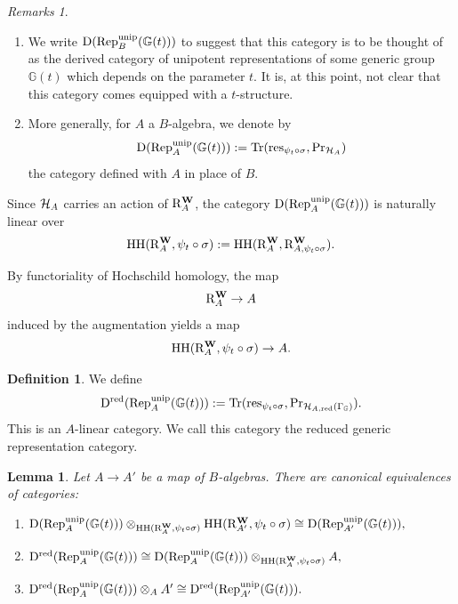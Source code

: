 \documentclass[a4paper, 10pt, oneside, reqno]{amsart}
\theoremstyle{plain}
\newtheorem{lem}[thm]{Lemma}
\theoremstyle{definition}
\newtheorem{defi}[thm]{Definition}
\theoremstyle{remark}
\newtheorem{rques}[thm]{Remarks}
\newcommand{\Gbb}{\mathbb{G}}
\newcommand{\RR}{\mathrm{R}}
\newcommand{\HHH}{\mathrm{HH}}
\newcommand{\Prr}{\mathrm{Pr}}
\newcommand{\restr}{\mathrm{res}}
\begin{document}
\begin{rques}
\begin{enumerate}
\item We write $\DD(\Rep_{B}^{\unip}(\Gbb(t)))$ to suggest that this category is to be thought of as the derived category of unipotent representations of some generic group $\Gbb(t)$ which depends on the parameter $t$. It is, at this point, not clear that this category comes equipped with a $t$-structure. 
\item More generally, for $A$ a $B$-algebra, we denote by 
$$\DD(\Rep_{A}^{\unip}(\Gbb(t))) := \Tr(\restr_{\psi_t \circ \sigma}, \Prr_{\Hcal_A})$$
the category defined with $A$ in place of $B$. 
\end{enumerate}
\end{rques}

Since $\mathcal{H}_A$ carries an action of $\RR_{A}^{\Wbf}$, the category $\DD(\Rep_{A}^{\unip}(\Gbb(t)))$ is naturally linear over 
$$\HHH(\RR_{A}^{\Wbf}, \psi_t \circ \sigma) := \HHH(\RR_{A}^{\Wbf}, \RR_{A, \psi_t \circ \sigma}^{\Wbf}).$$

By functoriality of Hochschild homology, the map 
$$\RR_A^{\Wbf} \to A$$
induced by the augmentation yields a map 
$$\HHH(\RR_{A}^{\Wbf}, \psi_t \circ \sigma) \to A.$$

\begin{defi}\label{defi:generic-reduced-representation-category}
We define 
$$\DD^{\red}(\Rep_{A}^{\unip}(\Gbb(t))) := \Tr(\restr_{\psi_t \circ \sigma}, \Prr_{\Hcal_{A,\red}(\Gamma_{\Gbb})}).$$
This is an $A$-linear category. We call this category the reduced generic representation category. 
\end{defi}


\begin{lem}\label{lem:specialization-of-trace}
Let $A \to A'$ be a map of $B$-algebras. There are canonical equivalences of categories: 
\begin{enumerate}
\item  $\DD(\Rep_{A}^{\unip}(\Gbb(t))) \otimes_{\HHH(\RR_{A}^{\Wbf}, \psi_t \circ \sigma)}\HHH(\RR_{A'}^{\Wbf}, \psi_t \circ \sigma) \cong \DD(\Rep_{A'}^{\unip}(\Gbb(t))),$
\item $\DD^{\red}(\Rep_{A}^{\unip}(\Gbb(t)))  \cong \DD(\Rep_{A}^{\unip}(\Gbb(t))) \otimes _{\HHH(\RR_{A}^{\Wbf}, \psi_t \circ \sigma)} A,$
\item $\DD^{\red}(\Rep_{A}^{\unip}(\Gbb(t))) \otimes_A A' \cong \DD^{\red}(\Rep_{A'}^{\unip}(\Gbb(t))).$
\end{enumerate} 
\end{lem}
\end{document}
